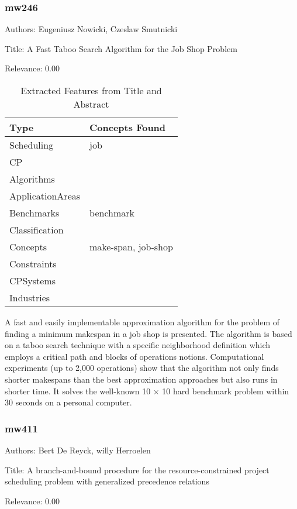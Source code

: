 \subsubsection{mw246}
\label{mw:mw246}

Authors: Eugeniusz Nowicki, Czeslaw Smutnicki

Title: A Fast Taboo Search Algorithm for the Job Shop Problem

Relevance:  0.00

{\scriptsize
\begin{longtable}{p{2cm}p{20cm}}
\caption{Extracted Features from Title and Abstract}\\ \toprule
Type & Concepts Found\\ \midrule
\endhead
\bottomrule
\endfoot
Scheduling & job\\ 
CP & \\ 
Algorithms & \\ 
ApplicationAreas & \\ 
Benchmarks & benchmark\\ 
Classification & \\ 
Concepts & make-span, job-shop\\ 
Constraints & \\ 
CPSystems & \\ 
Industries & \\ 
\end{longtable}
}

  A fast and easily implementable approximation algorithm for the problem of finding a minimum makespan in a job shop is presented. The algorithm is based on a taboo search technique with a specific neighborhood definition which employs a critical path and blocks of operations notions. Computational experiments (up to 2,000 operations) show that the algorithm not only finds shorter makespans than the best approximation approaches but also runs in shorter time. It solves the well-known 10 × 10 hard benchmark problem within 30 seconds on a personal computer.  

\subsubsection{mw411}
\label{mw:mw411}

Authors: Bert De Reyck, willy Herroelen

Title: A branch-and-bound procedure for the resource-constrained project scheduling problem with generalized precedence relations

Relevance:  0.00


